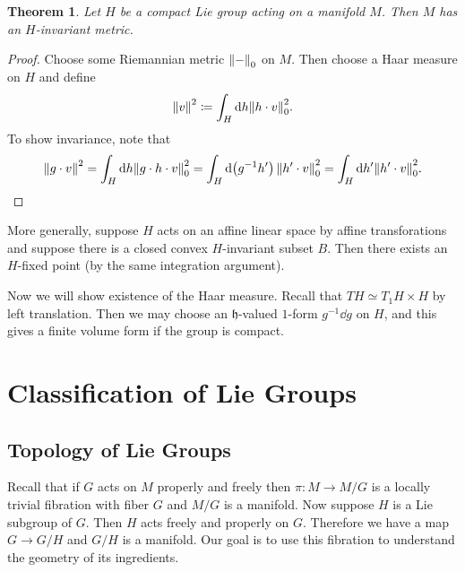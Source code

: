 \documentclass[leqno, openany]{memoir}
\newtheorem{thm}{Theorem}[section]
\theoremstyle{definition}
\theoremstyle{remark}
\theoremstyle{plain}
\theoremstyle{definition}
\theoremstyle{remark}
\newcommand{\mf}[1]{\mathfrak{#1}}
\begin{document}
\begin{thm}
    Let $H$ be a compact Lie group acting on a manifold $M$. Then $M$ has an $H$-invariant metric.
\end{thm}

\begin{proof}
    Choose some Riemannian metric $\norm{-}_0$ on $M$. Then choose a Haar measure on $H$ and define
    \[ \norm{v}^2 \coloneqq \int_H \dd h \norm{h \cdot v}_0^2. \]
    To show invariance, note that
    \[ \norm{g \cdot v}^2 = \int_H \dd h \norm{g \cdot h \cdot v}_0^2 = \int_H \dd(g^{-1}h') \norm{h' \cdot v}_0^2 = \int_H \dd h' \norm{h' \cdot v}_0^2. \qedhere \]
\end{proof}

More generally, suppose $H$ acts on an affine linear space by affine transforations and suppose there is a closed convex $H$-invariant subset $B$. Then there exists an $H$-fixed point (by the same integration argument).

Now we will show existence of the Haar measure. Recall that $T H \simeq T_1 H \times H$ by left translation. Then we may choose an $\mf{h}$-valued $1$-form $g^{-1} \dd g$ on $H$, and this gives a finite volume form if the group is compact.

\chapter{Classification of Lie Groups}%
\label{cha:classification_of_lie_groups}

\section{Topology of Lie Groups}%
\label{sec:topology_of_lie_groups}

Recall that if $G$ acts on $M$ properly and freely then $\pi: M \to M/G$ is a locally trivial fibration with fiber $G$ and $M/G$ is a manifold. Now suppose $H$ is a Lie subgroup of $G$. Then $H$ acts freely and properly on $G$. Therefore we have a map $G \to G/H$ and $G/H$ is a manifold. Our goal is to use this fibration to understand the geometry of its ingredients.
\end{document}
